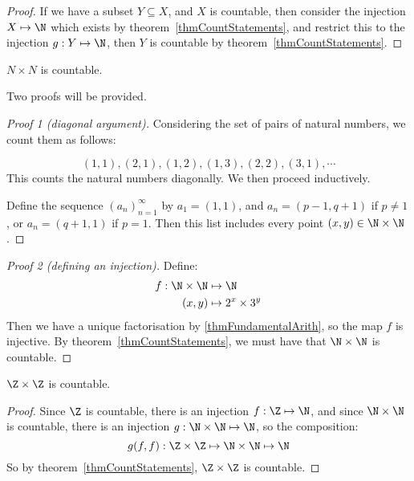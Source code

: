 \documentclass[../Main.tex]{subfiles}
\begin{document}
\begin{proof}
    If we have a subset $Y \subseteq X$, and $X$ is countable, then consider the injection $X \mapsto \N$ which exists by theorem~\ref{thmCountStatements}, and restrict this to the injection $g : Y \mapsto \N$, then $Y$ is countable by theorem~\ref{thmCountStatements}.
\end{proof}
\begin{theorem}
    $N \times N$ is countable.
    \label{thmDoubleNaturalCountable}
\end{theorem}
Two proofs will be provided.
\begin{proof}[Proof 1 (diagonal argument)]
    Considering the set of pairs of natural numbers, we count them as follows:\par
    \begin{equation*}
        (1, 1), (2, 1), (1, 2), (1, 3), (2, 2), (3, 1), \cdots
    \end{equation*}
    This counts the natural numbers diagonally. We then proceed inductively.\par
    Define the sequence $\left(a_n\right)^\infty_{n=1}$ by $a_1 = (1, 1)$, and $a_n = (p-1, q+1)$ if $p \neq 1$, or $a_n = (q+1, 1)$ if $p = 1$.
    Then this list includes every point $(x, y) \in \N \times \N$.
\end{proof}
\begin{proof}[Proof 2 (defining an injection)]
    Define:
    \begin{align*}
        f : \N \times \N &\mapsto \N \\
        (x, y) &\mapsto 2^x \times 3^y
    \end{align*}
    Then we have a unique factorisation by \ref{thmFundamentalArith}, so the map $f$ is injective. By theorem~\ref{thmCountStatements}, we must have that $\N \times \N$ is countable.
\end{proof}
\begin{corollary}
    $\Z \times \Z$ is countable.
    \label{corDoubleIntCountable}
\end{corollary}
\begin{proof}
    Since $\Z$ is countable, there is an injection $f : \Z \mapsto \N$, and since $\N \times \N$ is countable, there is an injection $g : \N \times \N \mapsto \N$, so the composition:
    \begin{equation*}
        g(f, f) : \Z \times \Z \mapsto \N \times \N \mapsto \N
    \end{equation*}
    So by theorem~\ref{thmCountStatements}, $\Z \times \Z$ is countable.
\end{proof}
\end{document}
